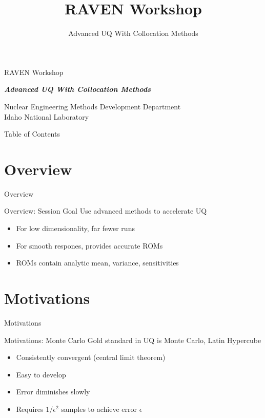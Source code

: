 \documentclass[t,9pt,svgnames]{beamer}
\makeatletter
\newcommand{\mytoc}{\@starttoc{toc}}
\makeatother
\begin{document}
\title[RAVEN Workshop]{RAVEN Workshop}
\subtitle{Advanced UQ With Collocation Methods}

\begin{titleframe}{RAVEN Workshop}

{\bfseries\emph{Advanced UQ With Collocation Methods}}

\vfill
{\small Nuclear Engineering Methods Development Department\\
Idaho National Laboratory}
\end{titleframe}

\begin{frame}{Table of Contents}
\mytoc
\end{frame}

%
%
\section{Overview}
\begin{frame}{Overview}
\end{frame}

\begin{frame}{Overview: Session Goal}
  \vfill
  Use advanced methods to accelerate UQ
  \vfill
  \begin{itemize}
    \item For low dimensionality, far fewer runs
  \vfill
    \item For smooth respones, provides accurate ROMs
  \vfill
    \item ROMs contain analytic mean, variance, sensitivities
  \vfill
  \end{itemize}
  \vfill
\end{frame}
%
%
\section{Motivations}
\begin{frame}{Motivations}
\end{frame}

\begin{frame}{Motivations: Monte Carlo}
  \vfill
  Gold standard in UQ is Monte Carlo, Latin Hypercube
  \vfill
  \begin{itemize}
    \item Consistently convergent (central limit theorem)
  \vfill
    \item Easy to develop
  \vfill
    \item Error diminishes slowly
  \vfill
    \item Requires $1/\epsilon^2$ samples to achieve error $\epsilon$
  \end{itemize}
  \vfill
\end{frame}
\end{document}
